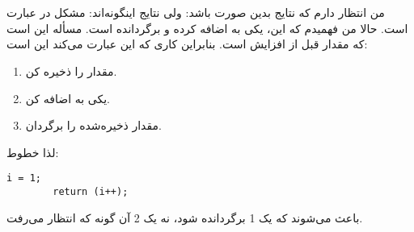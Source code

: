 \section{}
\paragraph{}\label{answer:102}
من انتظار دارم که نتایج بدین صورت باشد:
\LTR\noindent
{}
\RTL
ولی نتایج اینگونه‌اند:
\LTR\noindent
{}
\RTL
مشکل در عبارت  است. حالا من فهمیدم که این، یکی به  اضافه کرده و برگردانده است. مسأله این است که  مقدار  قبل از افزایش است. بنابراین کاری که این عبارت می‌کند این است:
\begin{enumerate}
    \item مقدار  را ذخیره کن.
    \item یکی به  اضافه کن.
    \item مقدار ذخیره‌شده را برگردان.
\end{enumerate}
\RTL
لذا خطوط:
\begin{LTR}
    \begin{lstlisting}[style=C++Style]
        i = 1;
        return (i++);
    \end{lstlisting}
\end{LTR}
\RTL
باعث می‌شوند که یک 1 برگردانده شود، نه یک 2 آن گونه که انتظار می‌رفت.